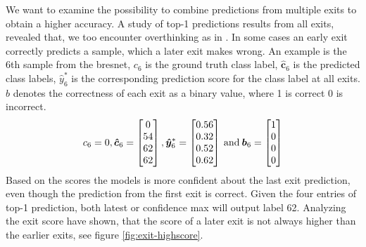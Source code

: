 We want to examine the possibility to combine predictions from multiple exits to obtain a higher accuracy. A study of top-1 predictions results from all exits, revealed that, we too encounter overthinking as in \cite{kaya_shallow-deep_nodate}. In some cases an early exit correctly predicts a sample, which a later exit makes wrong. An example is the 6th sample from the \gls{bresnet}, $ c_6 $ is the ground truth class label, $ \bm{\hat{c}}_6 $ is the predicted class labels, $ \hat{y}^*_6 $ is the corresponding prediction score for the class label at all exits. $ b $ denotes the correctness of each exit as a binary value, where 1 is correct 0 is incorrect.
\begin{align*}
c_6=0,
\bm{\hat{c}}_{6}=
\begin{bmatrix}
0 \\
54 \\
62 \\
62
\end{bmatrix},
\bm{\hat{y}}^{*}_{6}=
\begin{bmatrix}
0.56 \\
0.32 \\
0.52 \\
0.62
\end{bmatrix} \text{\:and\:}
\bm{b}_{6}=
\begin{bmatrix}
1 \\
0 \\
0 \\
0
\end{bmatrix}
\end{align*}
Based on the scores the models is more confident about the last exit prediction, even though the prediction from the first exit is correct. Given the four entries of top-1 prediction, both latest or confidence max will output label 62. Analyzing the exit score have shown, that the score of a later exit is not always higher than the earlier exits, see figure \ref{fig:exit-highscore}.

